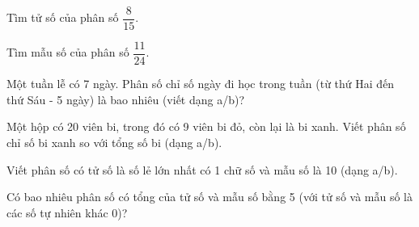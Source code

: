 \begin{ex} %
Tìm tử số của phân số $\dfrac{8}{15}$.
\end{ex}

\begin{ex} %
Tìm mẫu số của phân số $\dfrac{11}{24}$.
\end{ex}

\begin{ex} %
Một tuần lễ có 7 ngày. Phân số chỉ số ngày đi học trong tuần (từ thứ Hai đến thứ Sáu - 5 ngày) là bao nhiêu (viết dạng a/b)?
\end{ex}

\begin{ex} %
Một hộp có 20 viên bi, trong đó có 9 viên bi đỏ, còn lại là bi xanh. Viết phân số chỉ số bi xanh so với tổng số bi (dạng a/b).
\end{ex}

\begin{ex} %
Viết phân số có tử số là số lẻ lớn nhất có 1 chữ số và mẫu số là 10 (dạng a/b).
\end{ex}

\begin{ex} %
Có bao nhiêu phân số có tổng của tử số và mẫu số bằng 5 (với tử số và mẫu số là các số tự nhiên khác 0)?
\end{ex}
